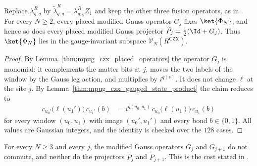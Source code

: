 \begin{lemma}
    \label{thm:mpug_czx_modified_invariant}
    \leanok
    Replace $\lambda^R_{g,g}$ by $\tilde\lambda^R_{g,g}=\lambda^R_{g,g}Z_1$ and
    keep the other three fusion operators, as in
    \cite[lines~5179--5183]{FrancoRubio2025MPUGauging}. For every $N\geq2$,
    every placed modified Gauss operator $G_j$ fixes $\ket{\Phi_N}$, and hence
    so does every placed modified Gauss projector
    $\widetilde P_j=\frac12(\Id+G_j)$. Thus $\ket{\Phi_N}$ lies in the
    gauge-invariant subspace $\mathcal V_N(R^{\mathrm{CZX}})$.
\end{lemma}

\begin{proof}\leanok
    By Lemma~\ref{thm:mpug_czx_placed_operators} the operator $G_j$ is
    monomial: it complements the matter bits at $j$, moves the two labels of
    the window by the Gauss leg action, and multiplies by $i^{q(s)}$. It does
    not change $\ell$ at the site $j$. By
    Lemma~\ref{thm:mpug_czx_gauged_state_product} the claim reduces to
    \begin{align}
        c_{u_0'}\bigl(\ell(u_1')\bigr)\,c_{u_1'}(b)
         & =i^{q(u_0,u_1)}\,c_{u_0}\bigl(\ell(u_1)\bigr)\,c_{u_1}(b)
    \end{align}
    for every window $(u_0,u_1)$ with image $(u_0',u_1')$ and every bond
    $b\in\{0,1\}$. All values are Gaussian integers, and the identity is
    checked over the $128$ cases.
\end{proof}

\begin{lemma}
    \label{thm:mpug_czx_projectors_noncommuting}
    \leanok
    For every $N\geq3$ and every $j$, the modified Gauss operators $G_j$ and
    $G_{j+1}$ do not commute, and neither do the projectors $\widetilde P_j$
    and $\widetilde P_{j+1}$. This is the cost stated in
    \cite[line~5183]{FrancoRubio2025MPUGauging}.
\end{lemma}

